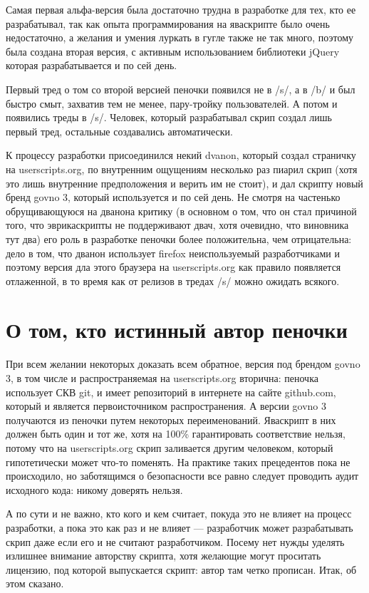 \documentclass[12pt,a4paper]{article}
\begin{document}
Самая первая альфа-версия была достаточно трудна в разработке для тех, кто ее разрабатывал, так как опыта программирования на яваскрипте было очень недостаточно, а желания и умения луркать в гугле также не так много, поэтому была создана вторая версия, с активным использованием библиотеки jQuery которая разрабатывается и по сей день.

Первый тред о том со второй версией пеночки появился не в /s/, а в /b/ и был быстро смыт, захватив тем не менее, пару-тройку пользователей. А потом и появились треды в /s/. Человек, который разрабатывал скрип создал лишь первый тред, остальные создавались автоматически. 

К процессу разработки присоединился некий dvanon, который создал страничку на userscripts.org, по внутренним ощущениям несколько раз пиарил скрип (хотя это лишь внутренние предположения и верить им не стоит), и дал скрипту новый бренд govno 3, который используется и по сей день. Не смотря на частенько обрущивающуюся на дванона критику (в основном о том, что он стал причиной того, что эврикаскрипты не поддерживают двач, хотя очевидно, что виновника тут два) его роль в разработке пеночки более положительна, чем отрицательна: дело в том, что дванон использует firefox неиспользуемый разработчиками и поэтому версия дла этого браузера на userscripts.org как правило появляется отлаженной, в то время как от релизов в тредах /s/ можно ожидать всякого.

\section*{О том, кто истинный автор пеночки}

При всем желании некоторых доказать всем обратное, версия под брендом govno 3, в том числе и распространяемая на userscripts.org вторична: пеночка использует СКВ git, и имеет репозиторий в интернете на сайте github.com, который и является первоисточником распространения. А версии govno 3 получаются из пеночки путем некоторых переименований. Яваскрипт в них должен быть один и тот же, хотя на 100\% гарантировать соответствие нельзя, потому что на userscripts.org скрип заливается другим человеком, который гипотетически может что-то поменять. На практике таких прецедентов пока не происходило, но заботящимся о безопасности все равно следует проводить аудит исходного кода: никому доверять нельзя. 

А по сути и не важно, кто кого и кем считает, покуда это не влияет на процесс разработки, а пока это как раз и не влияет --- разработчик может разрабатывать скрип даже если его и не считают разработчиком. Посему нет нужды уделять излишнее внимание авторству скрипта, хотя желающие могут проситать лицензию, под которой выпускается скрипт: автор там четко прописан. Итак, об этом сказано.
\end{document}

